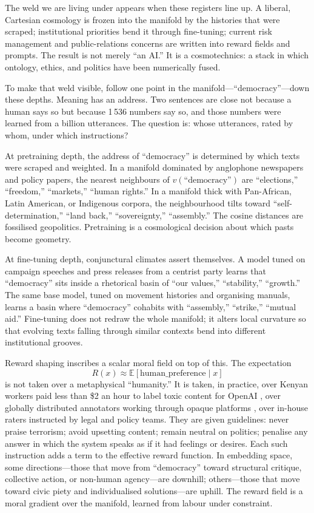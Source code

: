 \documentclass[12pt,a4paper]{article}
\begin{document}
The weld we are living under appears when these registers line up. A liberal, Cartesian cosmology is frozen into the manifold by the histories that were scraped; institutional priorities bend it through fine-tuning; current risk management and public-relations concerns are written into reward fields and prompts. The result is not merely ``an AI.'' It is a cosmotechnics: a stack in which ontology, ethics, and politics have been numerically fused.

To make that weld visible, follow one point in the manifold---``democracy''---down these depths. Meaning has an address. Two sentences are close not because a human says so but because 1\,536 numbers say so, and those numbers were learned from a billion utterances. The question is: whose utterances, rated by whom, under which instructions?

At pretraining depth, the address of ``democracy'' is determined by which texts were scraped and weighted. In a manifold dominated by anglophone newspapers and policy papers, the nearest neighbours of $v(\text{``democracy''})$ are ``elections,'' ``freedom,'' ``markets,'' ``human rights.'' In a manifold thick with Pan-African, Latin American, or Indigenous corpora, the neighbourhood tilts toward ``self-determination,'' ``land back,'' ``sovereignty,'' ``assembly.'' The cosine distances are fossilised geopolitics. Pretraining is a cosmological decision about which pasts become geometry.

At fine-tuning depth, conjunctural climates assert themselves. A model tuned on campaign speeches and press releases from a centrist party learns that ``democracy'' sits inside a rhetorical basin of ``our values,'' ``stability,'' ``growth.'' The same base model, tuned on movement histories and organising manuals, learns a basin where ``democracy'' cohabits with ``assembly,'' ``strike,'' ``mutual aid.'' Fine-tuning does not redraw the whole manifold; it alters local curvature so that evolving texts falling through similar contexts bend into different institutional grooves.

Reward shaping inscribes a scalar moral field on top of this. The expectation
\[
R(x) \approx \mathbb{E}[\text{human\_preference} \mid x]
\]
is not taken over a metaphysical ``humanity.'' It is taken, in practice, over Kenyan workers paid less than \$2 an hour to label toxic content for OpenAI \cite{time-rlhf-labor}, over globally distributed annotators working through opaque platforms \cite{mtreview-rlhf-labor}, over in-house raters instructed by legal and policy teams. They are given guidelines: never praise terrorism; avoid upsetting content; remain neutral on politics; penalise any answer in which the system speaks as if it had feelings or desires. Each such instruction adds a term to the effective reward function. In embedding space, some directions---those that move from ``democracy'' toward structural critique, collective action, or non-human agency---are downhill; others---those that move toward civic piety and individualised solutions---are uphill. The reward field is a moral gradient over the manifold, learned from labour under constraint.
\end{document}
